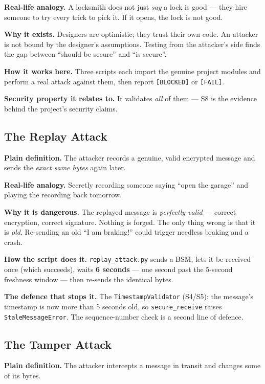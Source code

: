 \documentclass[11pt,a4paper]{article}
\begin{document}
\textbf{Real-life analogy.} A locksmith does not just \emph{say} a lock is good
--- they hire someone to try every trick to pick it. If it opens, the lock is
not good.

\textbf{Why it exists.} Designers are optimistic; they trust their own code. An
attacker is not bound by the designer's assumptions. Testing from the attacker's
side finds the gap between ``should be secure'' and ``is secure''.

\textbf{How it works here.} Three scripts each import the genuine project modules
and perform a real attack against them, then report \texttt{[BLOCKED]} or
\texttt{[FAIL]}.

\textbf{Security property it relates to.} It validates \emph{all} of them ---
S8 is the evidence behind the project's security claims.

\subsection{The Replay Attack}
\textbf{Plain definition.} The attacker records a genuine, valid encrypted
message and sends the \emph{exact same bytes} again later.

\textbf{Real-life analogy.} Secretly recording someone saying ``open the garage''
and playing the recording back tomorrow.

\textbf{Why it is dangerous.} The replayed message is \emph{perfectly valid} ---
correct encryption, correct signature. Nothing is forged. The only thing wrong is
that it is \emph{old}. Re-sending an old ``I am braking!'' could trigger needless
braking and a crash.

\textbf{How the script does it.} \texttt{replay\_attack.py} sends a BSM, lets it
be received once (which succeeds), waits \textbf{6 seconds} --- one second past
the 5-second freshness window --- then re-sends the identical bytes.

\textbf{The defence that stops it.} The \texttt{TimestampValidator} (S4/S5): the
message's timestamp is now more than 5 seconds old, so
\texttt{secure\_receive} raises \texttt{StaleMessageError}. The sequence-number
check is a second line of defence.

\subsection{The Tamper Attack}
\textbf{Plain definition.} The attacker intercepts a message in transit and
changes some of its bytes.
\end{document}
